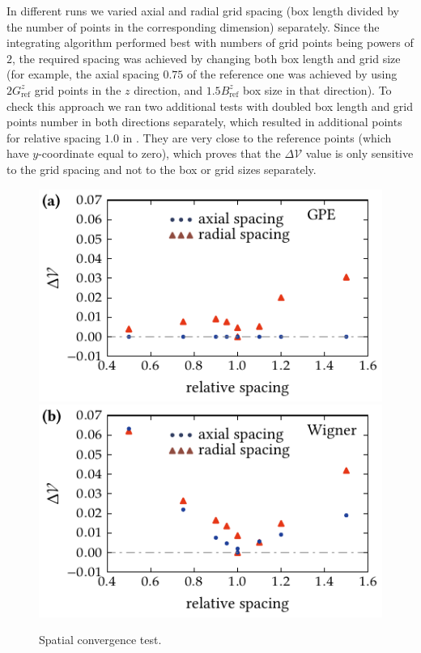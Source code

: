 In different runs we varied axial and radial grid spacing (box length divided by the number of points in the corresponding dimension) separately.
Since the integrating algorithm performed best with numbers of grid points being powers of $2$, the required spacing was achieved by changing both box length and grid size (for example, the axial spacing $0.75$ of the reference one was achieved by using $2 G_{\mathrm{ref}}^z$ grid points in the $z$ direction, and $1.5 B_{\mathrm{ref}}^z$ box size in that direction).
To check this approach we ran two additional tests with doubled box length and grid points number in both directions separately, which resulted in additional points for relative spacing $1.0$ in .
They are very close to the reference points (which have $y$-coordinate equal to zero), which proves that the $\Delta \mathcal{V}$ value is only sensitive to the grid spacing and not to the box or grid sizes separately.

\begin{figure}
    \centerline{%
    \includegraphics{figures_generated/test/grid_check_gpe.pdf}%
    \includegraphics{figures_generated/test/grid_check_wigner.pdf}}

    \caption[Spatial convergence test]{
    Spatial convergence test.
    }%

    \label{fig:bec-noise:grid:spatial-convergence}
\end{figure}

